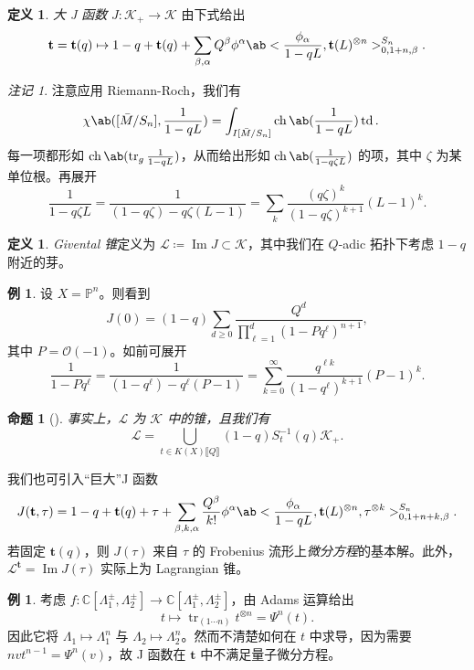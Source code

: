 \documentclass{amsart}
\newtheorem{prop}[thm]{命题}
\theoremstyle{definition}
\newtheorem{defn}[thm]{定义}
\newtheorem{exm}[thm]{例}
\theoremstyle{remark}
\newtheorem{rmk}[thm]{注记}
\theoremstyle{plain}
\theoremstyle{definition}
\theoremstyle{remark}
\DeclareMathOperator{\Ima}{Im}
\newcommand{\C}{\mathbb{C}}
\renewcommand{\P}{\mathbb{P}}
\newcommand{\mc}[1]{\mathcal{#1}}
\newcommand{\on}[1]{\operatorname{#1}}
\newcommand{\1}{\mathbf{1}}
\newcommand{\2}{\mathbf{2}}
\newcommand{\3}{\mathbf{3}}
\newcommand{\ps}[1]{\llbracket #1 \rrbracket}
\begin{document}
\begin{defn}
    \textit{大 J 函数} \(J \colon \mc{K}_+ \to \mc{K}\) 由下式给出
    \[ \mathbf{t} = \mathbf{t}(q) \mapsto 1 - q + \mathbf{t}(q) + \sum_{\beta, \alpha} Q^{\beta} \phi^{\alpha} \ab< \frac{\phi_{\alpha}}{1-qL}, \mathbf{t}(L)^{\otimes n}>_{0, 1+n, \beta}^{S_n}. \]
\end{defn}

\begin{rmk}
    注意应用 Riemann-Roch，我们有
    \begin{align*}
        \chi\ab([\bar{M}/S_n], \frac{1}{1-qL}) &= \int_{I[\bar{M}/S_n]} \on{ch}\ab(\frac{1}{1-qL}) \on{td}.
    \end{align*}
    每一项都形如 \(\on{ch}\ab(\on{tr}_g \frac{1}{1-qL})\)，从而给出形如 \(\on{ch}\ab(\frac{1}{1-q\zeta L})\) 的项，其中 \(\zeta\) 为某单位根。再展开
    \[ \frac{1}{1-q\zeta L} = \frac{1}{(1-q \zeta) - q\zeta (L-1)} = \sum_k \frac{(q\zeta)^k}{(1-q\zeta)^{k+1}}(L-1)^k. \]
\end{rmk}

\begin{defn}
    \textit{Givental 锥}定义为 \(\mc{L} \coloneqq \Ima J \subset \mc{K}\)，其中我们在 \(Q\)-adic 拓扑下考虑 \(1-q\) 附近的芽。
\end{defn}

\begin{exm}
    设 \(X = \P^n\)。则看到
    \[ J(0) = (1-q) \sum_{d \geq 0} \frac{Q^d}{\prod_{\ell=1}^d (1-Pq^{\ell})^{n+1}}, \]
    其中 \(P = \mc{O}(-1)\)。如前可展开
    \[ \frac{1}{1-P q^{\ell}} = \frac{1}{(1-q^{\ell}) - q^{\ell}(P-1)} = \sum_{k=0}^{\infty} \frac{q^{\ell k}}{(1-q^{\ell})^{k+1}}(P-1)^k. \]
\end{exm}

\begin{prop}[{\cite{GiventalK7}}]
    事实上，\(\mc{L}\) 为 \(\mc{K}\) 中的锥，且我们有
    \[ \mc{L} = \bigcup_{t \in K(X)\ps{Q}} (1-q) S_{t}^{-1}(q) \mc{K}_+. \]
\end{prop}

我们也可引入“巨大”J 函数
\[ J(\mathbf{t}, \tau) = 1-q + \mathbf{t}(q) + \tau + \sum_{\beta, k, \alpha} \frac{Q^{\beta}}{k!} \phi^{\alpha} \ab< \frac{\phi_{\alpha}}{1-qL}, \mathbf{t}(L)^{\otimes n}, \tau^{\otimes k}>_{0,1+n+k,\beta}^{S_n}. \]
若固定 \(\mathbf{t}(q)\)，则 \(J(\tau)\) 来自 \(\tau\) 的 Frobenius 流形上\textit{微分方程}的基本解。此外，\(\mc{L}^{\mathbf{t}}=  \Ima J(\tau)\) 实际上为 Lagrangian 锥。

\begin{exm}
    考虑 \(f \colon \C[\Lambda_1^{\pm}, \Lambda_2^{\pm}] \to \C[\Lambda_1^{\pm}, \Lambda_2^{\pm}]\)，由 Adams 运算给出
    \[ t \mapsto \on{tr}_{(1\cdots n)} t^{\otimes n} = \Psi^n (t). \]
    因此它将 \(\Lambda_1 \mapsto \Lambda_1^n\) 与 \(\Lambda_2 \mapsto \Lambda_2^n\)。然而不清楚如何在 \(t\) 中求导，因为需要 \(nv t^{n-1} = \Psi^n(v)\)，故 J 函数在 \(\mathbf{t}\) 中不满足量子微分方程。
\end{exm}
\end{document}
